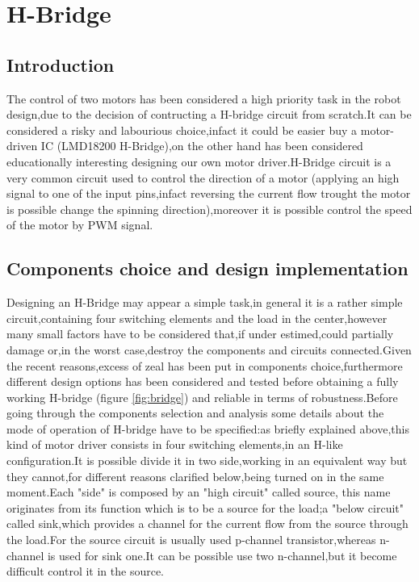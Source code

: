 \chapter{H-Bridge}

\section{Introduction}
The control of two motors has been considered a high priority task in the robot design,due to the decision of contructing a H-bridge circuit from scratch.It can be considered a risky and labourious choice,infact it could be easier buy a motor-driven IC (LMD18200 H-Bridge),on the other hand has been considered educationally interesting designing our own motor driver.H-Bridge circuit is a very common circuit used to control the direction of a motor (applying an high signal to one of the input pins,infact reversing the current flow trought the motor is possible change the spinning direction),moreover it is possible control the speed of the motor by PWM signal.


\section{Components choice and design implementation}
\label{sec:H-bridge_schematics}
Designing an H-Bridge may appear a simple task,in general it is a rather simple circuit,containing four switching elements and the load in the center,however many small factors have to be considered that,if under estimed,could partially damage or,in the worst case,destroy the components and circuits connected.Given the recent reasons,excess of zeal has been put in components choice,furthermore different design options has been considered and tested before obtaining a fully working H-bridge (figure \ref{fig:bridge}) and reliable in terms of robustness.Before going through the components selection and analysis some 
details about the mode of operation of H-bridge have to be specified:as briefly explained above,this kind of motor driver consists in four switching elements,in an H-like configuration.It is possible divide it in  two side,working in an equivalent way but they cannot,for different reasons clarified below,being turned on in the same moment.Each "side" is composed by an "high circuit" called source, this name originates from its function which is to be a source for the load;a "below circuit" called sink,which provides a channel for the current flow from the source through the load.For the source circuit is usually used p-channel transistor,whereas n-channel is used for sink one.It can be possible use two n-channel,but it become difficult control it in the source.


